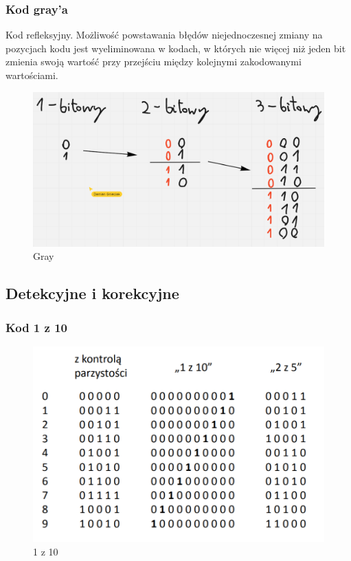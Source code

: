 \subsubsection{Kod gray'a}

Kod refleksyjny. Możliwość powstawania błędów niejednoczesnej zmiany na pozycjach kodu jest
wyeliminowana w kodach, w których nie więcej niż jeden bit zmienia swoją wartość przy
przejściu między kolejnymi zakodowanymi wartościami.

\begin{figure}[h!]
    \centering
    \includegraphics[width=.8\textwidth]{images/codes/kod_graya.png}
    \caption{Gray}
    \label{fig:my_label}
\end{figure}

\subsection{Detekcyjne i korekcyjne}

\subsubsection{Kod 1 z 10}

\begin{figure}[h!]
    \centering
    \includegraphics[width=.5\textwidth]{images/codes/detective.png}
    \caption{1 z 10}
    \label{fig:my_label}
\end{figure}

\newpage


